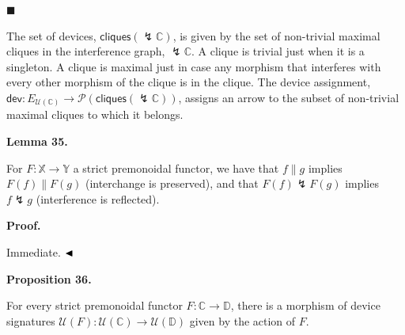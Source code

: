  
 
\par\noindent  $\blacksquare$ 
 
The set of devices, $\mathsf{cliques}({\lightning}\mathbb{C})$, is given by the set of non-trivial maximal cliques in the interference graph, ${\lightning}\mathbb{C}$. A clique is trivial just when it is a singleton. A clique is maximal just in case any morphism that interferes with every other morphism of the clique is in the clique. The device assignment, $\mathsf{dev}:E_{\mathcal{U}(\mathbb{C})}\to\mathscr{P}(\mathsf{cliques}({\lightning}\mathbb{C}))$, assigns an arrow to the subset of non-trivial maximal cliques to which it belongs.\par
 
 
  
 
 
 
\par\medskip\noindent\textbf{Lemma 35.}\par
 
 
For $F:\mathbb{X}\to\mathbb{Y}$ a strict premonoidal functor, we have that $f\parallel g$ implies $F(f)\parallel F(g)$ (interchange is preserved), and that $F(f)\lightning F(g)$ implies $f\lightning g$ (interference is reflected).\par
 
 
 
 
\par\medskip\noindent\textbf{Proof.}\par
 
 
Immediate. $\hfill\blacktriangleleft$\par
 
 
 
\par\medskip\noindent\textbf{Proposition 36.}\par
 
 
For every strict premonoidal functor $F:\mathbb{C}\to\mathbb{D}$, there is a morphism of device signatures $\mathcal{U}(F):\mathcal{U}(\mathbb{C})\to\mathcal{U}(\mathbb{D})$ given by the action of $F$.\par
 
